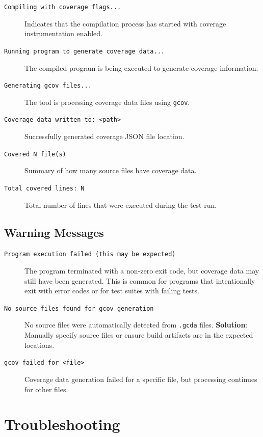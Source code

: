\begin{description}
    \item[\texttt{Compiling with coverage flags...}] Indicates that the compilation process has started with coverage instrumentation enabled.
    
    \item[\texttt{Running program to generate coverage data...}] The compiled program is being executed to generate coverage information.
    
    \item[\texttt{Generating gcov files...}] The tool is processing coverage data files using \texttt{gcov}.
    
    \item[\texttt{Coverage data written to: <path>}] Successfully generated coverage JSON file location.
    
    \item[\texttt{Covered N file(s)}] Summary of how many source files have coverage data.
    
    \item[\texttt{Total covered lines: N}] Total number of lines that were executed during the test run.
\end{description}

\subsection{Warning Messages}

\begin{description}
    \item[\texttt{Program execution failed (this may be expected)}] The program terminated with a non-zero exit code, but coverage data may still have been generated. This is common for programs that intentionally exit with error codes or for test suites with failing tests.
    
    \item[\texttt{No source files found for gcov generation}] No source files were automatically detected from \texttt{.gcda} files. \textbf{Solution}: Manually specify source files or ensure build artifacts are in the expected locations.
    
    \item[\texttt{gcov failed for <file>}] Coverage data generation failed for a specific file, but processing continues for other files.
\end{description}

\section{Troubleshooting}

